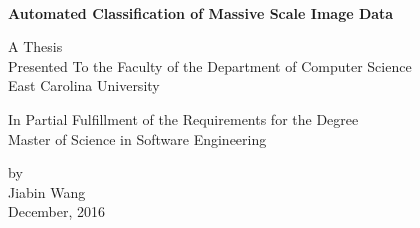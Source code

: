 
\thispagestyle{empty}
\hbox{\ }
\vspace{1in}
\renewcommand{\baselinestretch}{2}
\small\normalsize
\begin{center}

\textbf{Automated Classification of Massive Scale Image Data}

\vspace{2cm}

A Thesis\\
Presented To the Faculty of the Department of Computer Science\\
East Carolina University

\vspace{3cm}

In Partial Fulfillment of the Requirements for the Degree\\
Master of Science in Software Engineering

\vspace{3cm}

by\\
Jiabin Wang\\
December, 2016

\end{center}
